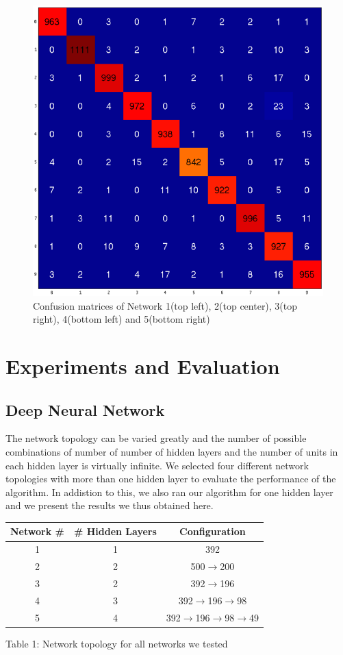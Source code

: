 \documentclass[10pt,twocolumn,letterpaper]{article}
\begin{document}
\begin{figure}
\begin{center}
	\includegraphics[scale=0.25]{../images/confusion_4.png}
\end{center}
	\caption{Confusion matrices of Network 1(top left), 2(top center), 3(top right), 4(bottom left) and 5(bottom right)}
	\label{fig:confusion}
\end{figure}
\section{Experiments and Evaluation}
\subsection{Deep Neural Network}
The network topology can be varied greatly and the number of possible combinations of number of number of hidden layers and the number of units in each hidden layer is virtually infinite. We selected four different network topologies with more than one hidden layer to evaluate the performance of the algorithm. In addistion to this, we also ran our algorithm for one hidden layer and we present the results we thus obtained here.
\begin{center}
\begin{tabular}{|c|c|c|}
	\hline
	\textbf{Network \#} & \textbf{\# Hidden Layers} & \textbf{Configuration}\\ \hline \hline
	1 & 1 & 392\\ \hline
	2 & 2 & 500$\rightarrow$200\\ \hline
	3 & 2 & 392$\rightarrow$196\\ \hline
	4 & 3 & 392$\rightarrow$196$\rightarrow$98\\ \hline
	5 & 4 & 392$\rightarrow$196$\rightarrow$98$\rightarrow$49\\ \hline
\end{tabular}
\end{center}
\begin{center}
	Table 1: Network topology for all networks we tested
\end{center}
\end{document}
